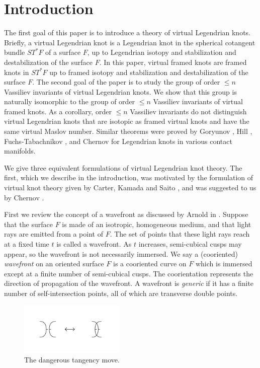 \section{Introduction}

  The first goal of this paper is to introduce a theory of virtual Legendrian knots. Briefly, a virtual Legendrian knot is a Legendrian knot in the spherical cotangent bundle $ST^*F$ of a surface $F$, up to Legendrian isotopy and stabilization and destabilization of the surface $F$.  In this paper, virtual framed knots are framed knots in $ST^*F$ up to framed isotopy and stabilization and destabilization of the surface $F$. The second goal of the paper is to study the group of order $\leq n$ Vassiliev invariants of virtual Legendrian knots.  We show that this group is naturally isomorphic to the group of order $\leq n$ Vassiliev invariants of virtual framed knots.  As a corollary, order $\leq n$ Vassiliev invariants do not distinguish virtual Legendrian knots that are isotopic as framed virtual knots and have the same virtual Maslov number.  Similar theorems were proved by Goryunov \cite{Goryunov}, Hill \cite{Hill}, Fuchs-Tabachnikov \cite{ft}, and Chernov \cite{Chernov} for Legendrian knots in various contact manifolds. 



We give three equivalent formulations of virtual Legendrian knot theory.  The first, which we describe in the introduction, was motivated by the formulation of virtual knot theory given by Carter, Kamada and Saito \cite{CKS}, and was suggested to us by Chernov \cite{ChernovDefn}. 


First we review the concept of a wavefront as discussed by Arnold in \cite{ArnoldMechanics}. Suppose that the surface $F$ is made of an isotropic, homogeneous medium, and that light rays are emitted from a point of $F$.  The set of points that these light rays reach at a fixed time $t$ is called a wavefront.  As $t$ increases, semi-cubical cusps may appear, so the wavefront is not necessarily immersed.  We say a (cooriented) {\it wavefront} on an oriented surface $F$ is a cooriented curve on $F$ which is immersed except at a finite number of semi-cubical cusps.  The coorientation represents the direction of propagation of the wavefront.  A wavefront is {\it generic} if it has a finite number of self-intersection points, all of which are transverse double points.  


\begin{figure}[htbp]
	\centering
	\includegraphics[width=5cm]{dangerousTangencyMove.pdf}
	\caption{The dangerous tangency move.}
	\label{dangerous.fig}
\end{figure}

